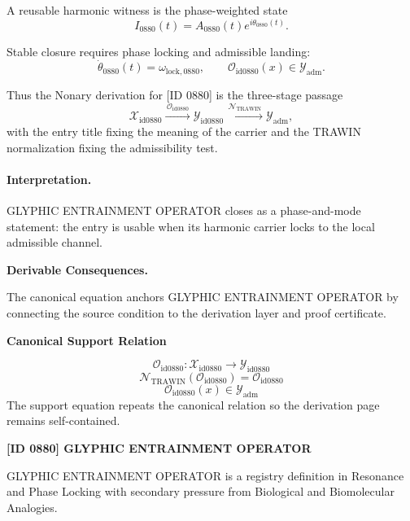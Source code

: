 A reusable harmonic witness is the phase-weighted state\[
I_{0880}(t)=A_{0880}(t)e^{i\theta_{0880}(t)}.
\]

Stable closure requires phase locking and admissible landing:\[
\dot{\theta}_{0880}(t)=\omega_{\mathrm{lock},0880},\qquad \mathcal{O}_{\mathrm{id0880}}(x)\in\mathcal{Y}_{\mathrm{adm}}.
\]

Thus the Nonary derivation for [ID 0880] is the three-stage passage
\[
\mathcal{X}_{\mathrm{id0880}}\xrightarrow{\,\mathcal{O}_{\mathrm{id0880}}\,} \mathcal{Y}_{\mathrm{id0880}}\xrightarrow{\,\mathcal{N}_{\mathrm{TRAWIN}}\,} \mathcal{Y}_{\mathrm{adm}},
\]
with the entry title fixing the meaning of the carrier and the TRAWIN normalization fixing the admissibility test.

\paragraph{Interpretation.} GLYPHIC ENTRAINMENT OPERATOR closes as a phase-and-mode statement: the entry is usable when its harmonic carrier locks to the local admissible channel.

\par\vspace{0.35em}
\noindent\textbf{Derivable Consequences.}\quad
\begingroup
\footnotesize
\raggedright
The canonical equation anchors GLYPHIC ENTRAINMENT OPERATOR by connecting the source condition to the derivation layer and proof certificate.
\par\endgroup

\noindent\textbf{Canonical Support Relation}\par
\[
\mathcal{O}_{\mathrm{id0880}}:\mathcal{X}_{\mathrm{id0880}}\longrightarrow\mathcal{Y}_{\mathrm{id0880}}
\]
\[
\mathcal{N}_{\mathrm{TRAWIN}}(\mathcal{O}_{\mathrm{id0880}})=\mathcal{O}_{\mathrm{id0880}}
\]
\[
\mathcal{O}_{\mathrm{id0880}}(x)\in\mathcal{Y}_{\mathrm{adm}}
\]
\noindent The support equation repeats the canonical relation so the derivation page remains self-contained.\par

\clearpage
\noindent\textbf{[ID 0880] GLYPHIC ENTRAINMENT OPERATOR}\par
\vspace{0.35em}
\begingroup\small
{}
GLYPHIC ENTRAINMENT OPERATOR is a registry definition in Resonance and Phase Locking with secondary pressure from Biological and Biomolecular Analogies.

